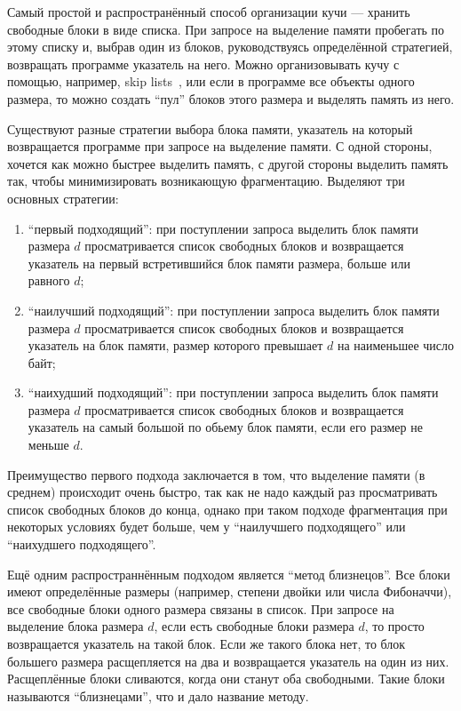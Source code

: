 \documentclass[12pt,a4paper]{article}
\begin{document}
Самый простой и распространённый способ организации кучи --- хранить свободные блоки в виде списка. При запросе на выделение памяти пробегать по этому списку и, выбрав один из блоков, руководствуясь определённой стратегией, возвращать программе указатель на него. Можно организовывать кучу с помощью, например, skip lists~\cite{skiplists}, или если в программе все объекты одного размера, то можно создать ``пул'' блоков этого размера и выделять память из него.

Существуют разные стратегии выбора блока памяти, указатель на который возвращается программе при запросе на выделение памяти. С одной стороны, хочется как можно быстрее выделить память, с другой стороны выделить память так, чтобы минимизировать возникающую фрагментацию. Выделяют три основных стратегии:
\begin{enumerate}
\item ``первый подходящий'': при поступлении запроса выделить блок памяти размера $d$ просматривается список свободных блоков и возвращается указатель на первый встретившийся блок памяти размера, больше или равного $d$;
\item ``наилучший подходящий'': при поступлении запроса выделить блок памяти размера $d$ просматривается список свободных блоков и возвращается указатель на блок памяти, размер которого превышает $d$ на наименьшее число байт;
\item ``наихудший подходящий'': при поступлении запроса выделить блок памяти размера $d$ просматривается список свободных блоков и возвращается указатель на самый большой по обьему блок памяти, если его размер не меньше $d$.
\end{enumerate}

Преимущество первого подхода заключается в том, что выделение памяти (в среднем)
происходит очень быстро, так как не надо каждый раз просматривать список свободных блоков до конца,
однако при таком подходе фрагментация при некоторых условиях будет больше, чем у 
``наилучшего подходящего'' или ``наихудшего подходящего''.

Ещё одним распространнённым подходом является ``метод близнецов''. Все блоки имеют 
определённые размеры (например, степени двойки или числа Фибоначчи), все свободные блоки
одного размера связаны в список. При запросе на выделение блока размера $d$, если есть свободные
блоки размера $d$, то просто возвращается указатель на такой блок. Если же такого блока нет, 
то блок большего размера расщепляется на два и возвращается указатель на один из них. 
Расщеплённые блоки сливаются, когда они станут оба свободными. Такие блоки называются
``близнецами'', что и дало название методу.
\end{document}
